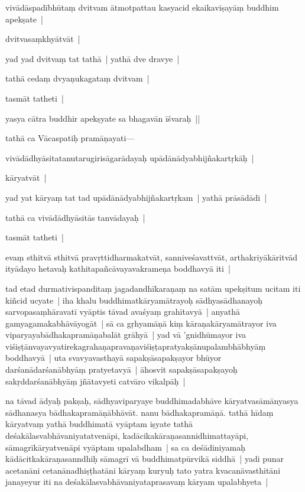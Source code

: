 \documentclass[article,12pt,a4paper]{memoir}
\begin{document}
	  \pstart vivādāspadībhūtaṃ dvitvam ātmotpattau kasyacid ekaikaviṣayāṃ buddhim apekṣate |
	\pend
      

	  \pstart dvitvasaṃkhyātvāt |
	\pend
      

	  \pstart yad yad dvitvaṃ tat tathā | yathā dve dravye |
	\pend
      

	  \pstart tathā cedaṃ dvyaṇukagataṃ dvitvam |
	\pend
      

	  \pstart tasmāt tatheti |
	\pend
      

	  \pstart yasya cātra buddhir apekṣyate sa bhagavān īśvaraḥ ||
	\pend
      

	  \pstart tathā ca Vācaspatiḥ pramāṇayati—
	\pend
      

	  \pstart vivādādhyāsitatanutarugirisāgarādayaḥ upādānādyabhijñakartṛkāḥ |
	\pend
      

	  \pstart kāryatvāt |
	\pend
      

	  \pstart yad yat kāryaṃ tat tad upādānādyabhijñakartṛkam | yathā prāsādādi |
	\pend
      

	  \pstart tathā ca vivādādhyāsitās tanvādayaḥ |
	\pend
      

	  \pstart tasmāt tatheti |
	\pend
      

	  \pstart evaṃ sthitvā sthitvā pravṛttidharmakatvāt, sanniveśavattvāt, arthakriyākāritvād ityādayo hetavaḥ kathitapañcāvayavakrameṇa boddhavyā iti |
	\pend
      \label{īsd-uttarapakṣa}
	  
	\label{īsd-vyāptigrahaṇa}
	  
	

	  \pstart tad etad durmativispanditaṃ jagadandhīkaraṇaṃ na satām upekṣitum ucitam iti kiñcid ucyate | iha khalu buddhimatkāryamātrayoḥ sādhyasādhanayoḥ sarvopasaṃhāravatī vyāptis tāvad avaśyaṃ grahītavyā | anyathā gamyagamakabhāvāyogāt | sā ca gṛhyamāṇā kiṃ kāraṇakāryamātrayor iva viparyayabādhakapramāṇabalāt grāhyā | yad vā 'gnidhūmayor iva viśiṣṭānvayavyatirekagrahaṇapravaṇaviśiṣṭapratyakṣānupalambhābhyāṃ boddhavyā | uta svavyavasthayā sapakṣāsapakṣayor bhūyor darśanādarśanābhyāṃ pratyetavyā | āhosvit sapakṣāsapakṣayoḥ sakṛddarśanābhyāṃ jñātavyeti catvāro vikalpāḥ |
	\pend
      
	  
	

	  \pstart na tāvad ādyaḥ pakṣaḥ, sādhyaviparyaye buddhimadabhāve kāryatvasāmānyasya sādhanasya bādhakapramāṇābhāvāt. nanu bādhakapramāṇā. tathā hīdaṃ kāryatvaṃ yathā buddhimatā vyāptam iṣyate tathā deśakālasvabhāvaniyatatvenāpi, kadācikakāraṇasannidhimattayāpi, sāmagrīkāryatvenāpi vyāptam upalabdham | sa ca deśādiniyamaḥ kādācitkakāraṇasanndhiḥ sāmagrī vā buddhimatpūrvikā siddhā | yadi punar acetanāni cetanānadhiṣṭhatāni kāryaṃ kuryuḥ tato yatra kvacanāvasthitāni janayeyur iti na deśakālasvabhāvaniyataprasavaṃ kāryam upalabhyeta |
	\pend
      
\end{document}
